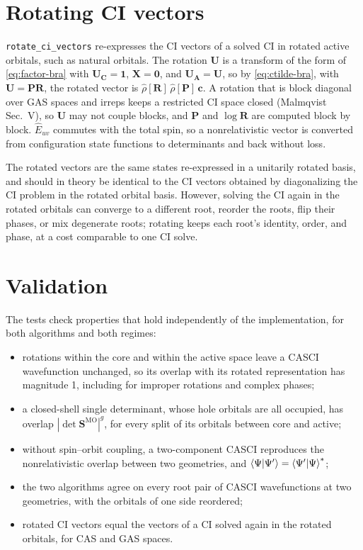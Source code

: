 \documentclass[aip,jcp,preprint]{revtex4-1}
\newcommand{\bvec}[1]{\mathbf{#1}}
\newcommand{\SMO}{\bvec{S}^{\mathrm{MO}}}
\begin{document}
\section{Rotating CI vectors}
\label{sec:rotation}

\texttt{rotate\_ci\_vectors} re-expresses the CI vectors of a solved CI in rotated active orbitals, such as natural orbitals.
The rotation $\bvec{U}$ is a transform of the form of \cref{eq:factor-bra} with $\bvec{U}_{\bvec{C}} = \bvec{1}$, $\bvec{X} = \bvec{0}$, and $\bvec{U}_{\bvec{A}} = \bvec{U}$, so by \cref{eq:ctilde-bra}, with $\bvec{U} = \bvec{P}\bvec{R}$, the rotated vector is $\hat{\rho}[\bvec{R}]\,\hat{\rho}[\bvec{P}]\,\bvec{c}$.
A rotation that is block diagonal over GAS spaces and irreps keeps a restricted CI space closed (Malmqvist Sec.~V), so $\bvec{U}$ may not couple blocks, and $\bvec{P}$ and $\log\bvec{R}$ are computed block by block.
$\hat{E}_{uv}$ commutes with the total spin, so a nonrelativistic vector is converted from configuration state functions to determinants and back without loss.

The rotated vectors are the same states re-expressed in a unitarily rotated basis, and should in theory be identical to the CI vectors obtained by diagonalizing the CI problem in the rotated orbital basis.
However, solving the CI again in the rotated orbitals can converge to a different root, reorder the roots, flip their phases, or mix degenerate roots; rotating keeps each root's identity, order, and phase, at a cost comparable to one CI solve.

\section{Validation}
\label{sec:validation}

The tests check properties that hold independently of the implementation, for both algorithms and both regimes:
\begin{itemize}
\item rotations within the core and within the active space leave a CASCI wavefunction unchanged, so its overlap with its rotated representation has magnitude 1, including for improper rotations and complex phases;
\item a closed-shell single determinant, whose hole orbitals are all occupied, has overlap $|\det\SMO|^g$, for every split of its orbitals between core and active;
\item without spin--orbit coupling, a two-component CASCI reproduces the nonrelativistic overlap between two geometries, and $\braket{\Psi|\Psi'} = \braket{\Psi'|\Psi}^*$;
\item the two algorithms agree on every root pair of CASCI wavefunctions at two geometries, with the orbitals of one side reordered;
\item rotated CI vectors equal the vectors of a CI solved again in the rotated orbitals, for CAS and GAS spaces.
\end{itemize}
\end{document}
